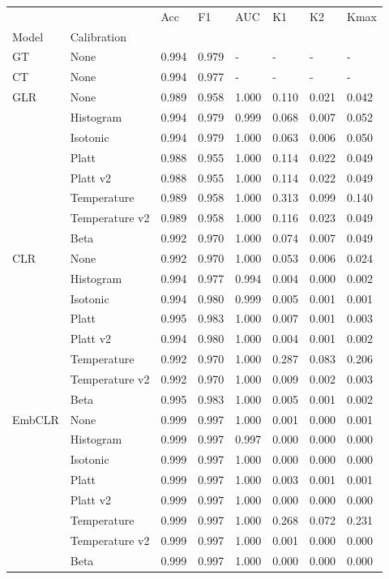 \begin{tabular}{llllllll}
\toprule
 &  & Acc & F1 & AUC & K1 & K2 & Kmax \\
Model & Calibration &  &  &  &  &  &  \\
\midrule
GT & None & 0.994 & 0.979 & - & - & - & - \\
\cline{1-8}
CT & None & 0.994 & 0.977 & - & - & - & - \\
\cline{1-8}
\multirow[t]{8}{*}{GLR} & None & 0.989 & 0.958 & 1.000 & 0.110 & 0.021 & 0.042 \\
 & Histogram & 0.994 & 0.979 & 0.999 & 0.068 & 0.007 & 0.052 \\
 & Isotonic & 0.994 & 0.979 & 1.000 & 0.063 & 0.006 & 0.050 \\
 & Platt & 0.988 & 0.955 & 1.000 & 0.114 & 0.022 & 0.049 \\
 & Platt v2 & 0.988 & 0.955 & 1.000 & 0.114 & 0.022 & 0.049 \\
 & Temperature & 0.989 & 0.958 & 1.000 & 0.313 & 0.099 & 0.140 \\
 & Temperature v2 & 0.989 & 0.958 & 1.000 & 0.116 & 0.023 & 0.049 \\
 & Beta & 0.992 & 0.970 & 1.000 & 0.074 & 0.007 & 0.049 \\
\cline{1-8}
\multirow[t]{8}{*}{CLR} & None & 0.992 & 0.970 & 1.000 & 0.053 & 0.006 & 0.024 \\
 & Histogram & 0.994 & 0.977 & 0.994 & 0.004 & 0.000 & 0.002 \\
 & Isotonic & 0.994 & 0.980 & 0.999 & 0.005 & 0.001 & 0.001 \\
 & Platt & 0.995 & 0.983 & 1.000 & 0.007 & 0.001 & 0.003 \\
 & Platt v2 & 0.994 & 0.980 & 1.000 & 0.004 & 0.001 & 0.002 \\
 & Temperature & 0.992 & 0.970 & 1.000 & 0.287 & 0.083 & 0.206 \\
 & Temperature v2 & 0.992 & 0.970 & 1.000 & 0.009 & 0.002 & 0.003 \\
 & Beta & 0.995 & 0.983 & 1.000 & 0.005 & 0.001 & 0.002 \\
\cline{1-8}
\multirow[t]{8}{*}{EmbCLR} & None & 0.999 & 0.997 & 1.000 & 0.001 & 0.000 & 0.001 \\
 & Histogram & 0.999 & 0.997 & 0.997 & 0.000 & 0.000 & 0.000 \\
 & Isotonic & 0.999 & 0.997 & 1.000 & 0.000 & 0.000 & 0.000 \\
 & Platt & 0.999 & 0.997 & 1.000 & 0.003 & 0.001 & 0.001 \\
 & Platt v2 & 0.999 & 0.997 & 1.000 & 0.000 & 0.000 & 0.000 \\
 & Temperature & 0.999 & 0.997 & 1.000 & 0.268 & 0.072 & 0.231 \\
 & Temperature v2 & 0.999 & 0.997 & 1.000 & 0.001 & 0.000 & 0.000 \\
 & Beta & 0.999 & 0.997 & 1.000 & 0.000 & 0.000 & 0.000 \\
\cline{1-8}
\bottomrule
\end{tabular}
